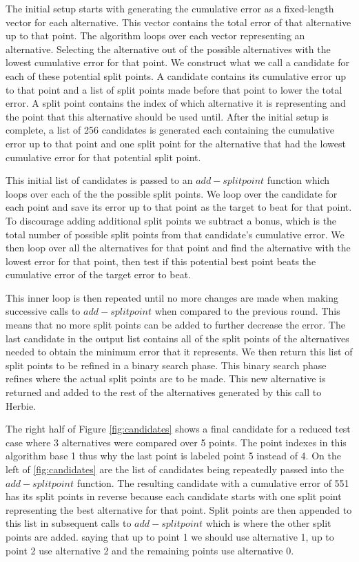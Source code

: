 \documentclass{article}
\begin{document}
The initial setup starts with generating the cumulative error as a fixed-length vector for each alternative. This vector contains the total error of that alternative up to that point. The algorithm loops over each vector representing an alternative. Selecting the alternative out of the possible alternatives with the lowest cumulative error for that point. We construct what we call a candidate for each of these potential split points. A candidate contains its cumulative error up to that point and a list of split points made before that point to lower the total error. A split point contains the index of which alternative it is representing and the point that this alternative should be used until. After the initial setup is complete, a list of 256 candidates is generated each containing the cumulative error up to that point and one split point for the alternative that had the lowest cumulative error for that potential split point.

This initial list of candidates is passed to an $add-splitpoint$ function which loops over each of the the possible split points. We loop over the candidate for each point and save its error up to that point as the target to beat for that point. To discourage adding additional split points we subtract a bonus, which is the total number of possible split points from that candidate's cumulative error. We then loop over all the alternatives for that point and find the alternative with the lowest error for that point, then test if this potential best point beats the cumulative error of the target error to beat.

This inner loop is then repeated until no more changes are made when making successive calls to $add-splitpoint$ when compared to the previous round. This means that no more split points can be added to further decrease the error. The last candidate in the output list contains all of the split points of the alternatives needed to obtain the minimum error that it represents. We then return this list of split points to be refined in a binary search phase. This binary search phase refines where the actual split points are to be made. This new alternative is returned and added to the rest of the alternatives generated by this call to Herbie.

The right half of Figure \ref{fig:candidates} shows a final candidate for a reduced test case where 3 alternatives were compared over 5 points. The point indexes in this algorithm base 1 thus why the last point is labeled point 5 instead of 4. On the left of \ref{fig:candidates} are the list of candidates being repeatedly passed into the $add-splitpoint$ function. The resulting candidate with a cumulative error of 551 has its split points in reverse because each candidate starts with one split point representing the best alternative for that point. Split points are then appended to this list in subsequent calls to $add-splitpoint$  which is where the other split points are added. saying that up to point 1 we should use alternative 1, up to point 2 use alternative 2 and the remaining points use alternative 0.
\end{document}
